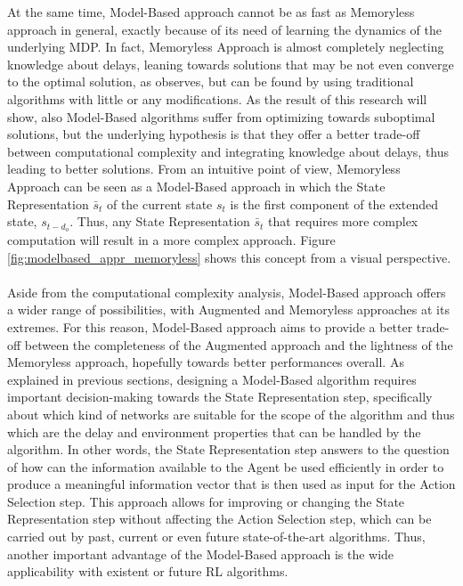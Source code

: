                 At the same time, Model-Based approach cannot be as fast as Memoryless approach in general, exactly because of its need of learning the dynamics of the underlying MDP. In fact, Memoryless Approach is almost completely neglecting knowledge about delays, leaning towards solutions that may be not even converge to the optimal solution, as  observes, but can be found by using traditional algorithms with little or any modifications. As the result of this research will show, also Model-Based algorithms suffer from optimizing towards suboptimal solutions, but the underlying hypothesis is that they offer a better trade-off between computational complexity and integrating knowledge about delays, thus leading to better solutions. From an intuitive point of view, Memoryless Approach can be seen as a Model-Based approach in which the State Representation $\bar{s}_t$ of the current state $s_t$ is the first component of the extended state, $s_{t-d_o}$. Thus, any State Representation $\bar{s}_t$ that requires more complex computation will result in a more complex approach. Figure \ref{fig:modelbased_appr_memoryless} shows this concept from a visual perspective.
                \\\\
                Aside from the computational complexity analysis, Model-Based approach offers a wider range of possibilities, with Augmented and Memoryless approaches at its extremes. For this reason, Model-Based approach aims to provide a better trade-off between the completeness of the Augmented approach and the lightness of the Memoryless approach, hopefully towards better performances overall. As explained in previous sections, designing a Model-Based algorithm requires important decision-making towards the State Representation step, specifically about which kind of networks are suitable for the scope of the algorithm and thus which are the delay and environment properties that can be handled by the algorithm. In other words, the State Representation step answers to the question of how can the information available to the Agent be used efficiently in order to produce a meaningful information vector that is then used as input for the Action Selection step. This approach allows for improving or changing the State Representation step without affecting the Action Selection step, which can be carried out by past, current or even future state-of-the-art algorithms. Thus, another important advantage of the Model-Based approach is the wide applicability with existent or future RL algorithms.
                

